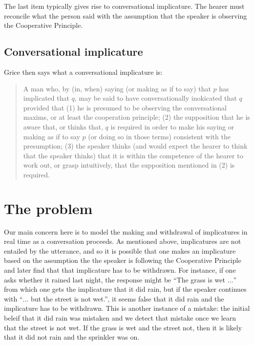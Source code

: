 \documentclass{article}
\begin{document}
The last item typically gives rise to conversational implicature. The
hearer must reconcile what the person said with the assumption that the
speaker is observing the Cooperative Principle.

\subsection{Conversational implicature}

Grice then says what a conversational implicature is:
\begin{quote}
A man who, by (in, when) saying (or making as if to say) that $p$ has
implicated that $q$, may be said to have conversationally inokicated
that $q$ provided that (1) he is presumed to be observing the
conversational maxims, or at least the cooperation principle; (2) the
supposition that he is aware that, or thinks that, $q$ is required in
order to make his saying or making as if to say $p$ (or doing so in
those terms) consistent with the presumption; (3) the speaker thinks
(and would expect the hearer to think that the speaker thinks) that it
is within the competence of the hearer to work out, or grasp
intuitively, that the supposition mentioned in (2) is required.
\end{quote}


\section{The problem}

Our main concern here is to model the making and withdrawal of
implicatures in real time as a conversation proceeds. As mentioned
above, implicatures are not entailed by the utterance, and so it is
possible that one makes an implicature based on the assumption the the
speaker is following the Cooperative Principle and later find that
that implicature has to be withdrawn. For instance, if one asks
whether it rained last night, the response might be ``The grass is
wet $\ldots$'' from which one gets the implicature that it did rain,
but if the speaker continues with ``$\ldots$ but the street is not
wet.'', it seems false that it did rain and the implicature has to be
withdrawn. This is another instance of a mistake: the initial beleif
that it did rain was mistaken and we detect that mistake once we learn
that the street is not wet. If the grass is wet and the street not,
then it is likely that it did not rain and the sprinkler was on.
\end{document}
